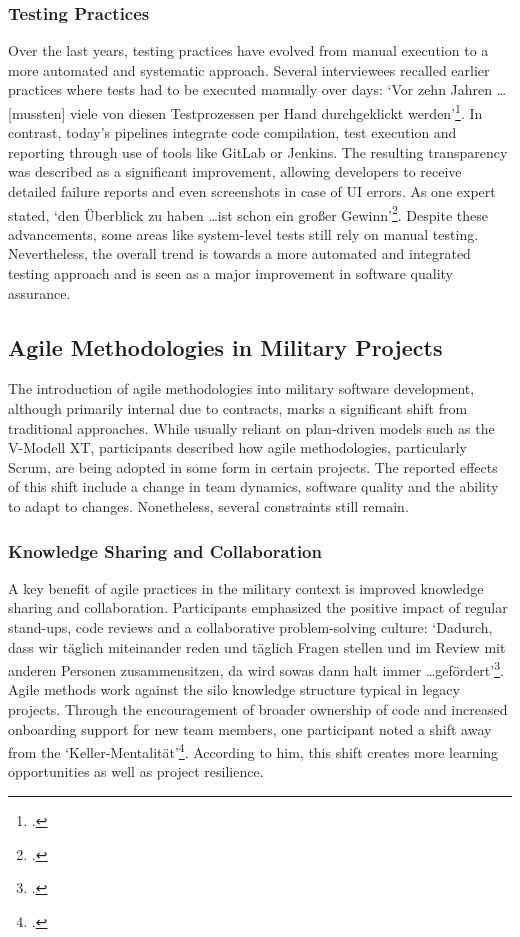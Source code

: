 \subsubsection{Testing Practices}
Over the last years, testing practices have evolved from manual execution to a more automated and systematic approach. Several interviewees recalled earlier practices where tests had to be executed manually over days: `Vor zehn Jahren \ldots [mussten] viele von diesen Testprozessen per Hand durchgeklickt werden'\footcite{Interview22025}. In contrast, today's pipelines
integrate code compilation, test execution and reporting through use of tools like GitLab or Jenkins.
The resulting transparency was described as a significant improvement, allowing developers to receive detailed failure reports and even screenshots in case of \ac{UI} errors. As one expert stated, `den Überblick zu haben \ldots ist schon ein großer Gewinn'\footcite{Interview12025}.
Despite these advancements, some areas like system-level tests still rely on manual testing. Nevertheless, the overall trend is towards a more automated and integrated testing approach and is seen as a major improvement in software quality assurance.

\subsection{Agile Methodologies in Military Projects}
The introduction of agile methodologies into military software development, although primarily internal due to contracts, marks a significant shift from traditional approaches. While usually reliant on plan-driven models such as the V-Modell XT, participants described how agile methodologies, particularly Scrum, are being adopted in some form in certain projects.
The reported effects of this shift include a change in team dynamics, software quality and the ability to adapt to changes. Nonetheless, several constraints still remain.

\subsubsection{Knowledge Sharing and Collaboration}
A key benefit of agile practices in the military context is improved knowledge sharing and collaboration. Participants emphasized the positive impact of regular stand-ups, code reviews and a collaborative problem-solving culture: `Dadurch, dass wir täglich miteinander reden und täglich Fragen stellen und im Review mit anderen 
Personen zusammensitzen, da wird sowas dann halt immer \ldots gefördert'\footcite{Interview32025}. Agile methods work against the silo knowledge structure typical in legacy projects. Through the encouragement of broader ownership of code and increased onboarding support for new team members, one participant noted a shift away from the `Keller-Mentalität'\footcite{Interview22025}. According to him,
this shift creates more learning opportunities as well as project resilience.

